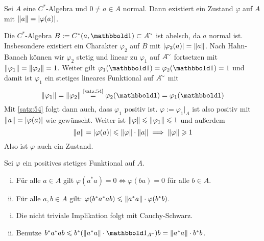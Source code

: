 \begin{satz}[{name=[Existenz von Zuständen zu gegebenen normalen Elementen]},label=satz:55]
	Sei $A$ eine $C^*$-Algebra und $0\neq a \in A$ normal.
	Dann existiert ein Zustand $\varphi$ auf $A$ mit $\norm*{a}=\abs*{\varphi(a)}$.
\end{satz}
\begin{beweis}
	Die $C^*$-Algebra $B := C^*(a, \ind)\subset A^\simm$ ist abelsch, da $a$ normal ist. 
	Insbesondere existiert ein Charakter $\varphi_2$ auf $B$ mit $\abs*{\varphi_2(a)}=\norm*{a}$.
	Nach Hahn-Banach können wir $\varphi_2$ stetig und linear zu $\varphi_1$ auf $A^\simm$ fortsetzen mit $\norm*{\varphi_1} = \norm*{\varphi_2}=1$.
	Weiter gilt $\varphi_1(\ind)= \varphi_2(\ind)=1$ und damit ist $\varphi_1$ ein stetiges lineares Funktional auf $A^\simm$ mit 
	\[
		\norm*{\varphi_1} = \norm*{\varphi_2}\StackText{\ref{satz:54}}{=} \varphi_2(\ind) = \varphi_1(\ind)
	\]
	Mit \autoref{satz:54} folgt dann auch, dass $\varphi_1$ positiv ist. $\varphi := \varphi_1|_A$ ist also positiv mit $\norm*{a}= \abs*{\varphi(a)}$ wie gewünscht.
	Weiter ist $\norm*{\varphi} \le \norm*{\varphi_1} \le 1$ und außerdem 
	\[
		\norm*{a} = \abs*{\varphi(a)} \le \norm*{\varphi} \cdot \norm*{a} \implies \norm*{\varphi} \ge 1
	\]
	Also ist $\varphi$ auch ein Zustand.
\end{beweis}

\begin{proposition}[label=prop:56,{name=[{positive Funktionale und Elemente der Form $a^*a$}]}]
	Sei $\varphi$ ein positives stetiges Funktional auf $A$. 
	\begin{enumerate}[(i),itemsep=0pt]
		\item Für alle $a \in A$ gilt $\varphi(a^*a)=0 \iff \varphi(ba)=0$ für alle $b \in A$.
		\item Für alle $a,b \in A$ gilt: $\varphi(b^*a^*ab) \le \norm*{a^*a}\cdot \varphi(b^*b)$.
	\end{enumerate}
\end{proposition}
\begin{beweis}
	\leavevmode
	\begin{enumerate}[(i),itemsep=0pt]
		\item Die nicht triviale Implikation folgt mit Cauchy-Schwarz.
		\item Benutze $b^*a^*ab \le b^* \enbrace*{\norm*{a^*a} \cdot \ind_{A^\simm}}b = \norm*{a^*a} \cdot b^*b$. \qedhere
	\end{enumerate}
\end{beweis}


